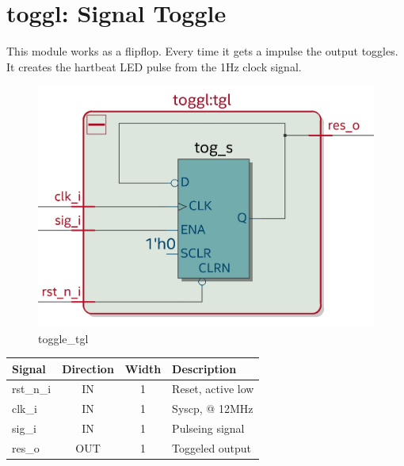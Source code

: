 \documentclass[12pt,a4 paper] {report}
\begin{document}
\section{toggl: Signal Toggle}
This module works as a flipflop. Every time it gets a impulse the output toggles. It creates the hartbeat LED pulse 
from the 1Hz clock signal.
\begin{figure}[h]
	\centering	
	\includegraphics[scale=0.15]{../png/toggl_tgl.png}
	\caption{toggle\_tgl}
\end{figure}
\begin{center}
	\begin{tabular}{ | p{2cm} | c | c | p{5cm} |}
		\hline
		\textbf{Signal} & \textbf{Direction} & \textbf{Width} & \textbf{Description} \\
		\hline	
	  rst\_n\_i & IN & 1 & Reset, active low \\
	  \hline
		clk\_i & IN & 1 & Syscp, @ 12MHz \\
		\hline
		sig\_i & IN & 1 & Pulseing signal \\
		\hline
		res\_o & OUT & 1 & Toggeled output \\
		\hline
	\end{tabular}
\end{center}

\newpage
\end{document}
